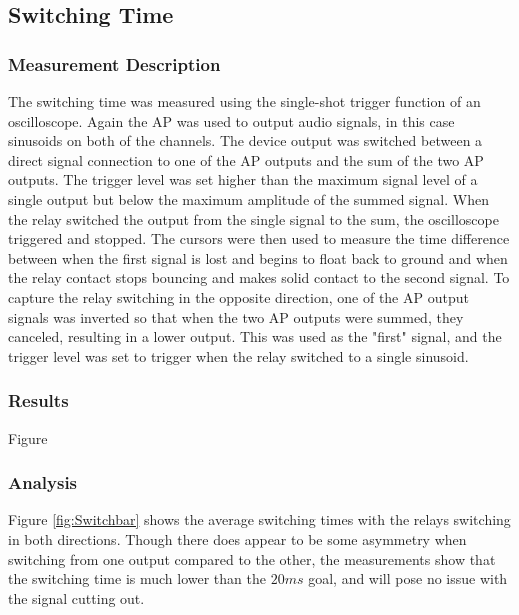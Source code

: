	\subsection{Switching Time}
		\subsubsection{Measurement Description}
		The switching time was measured using the single-shot trigger function of an oscilloscope.  Again the AP was used to output audio signals, in this case sinusoids on both of the channels.  The device output was switched between a direct signal connection to one of the AP outputs and the sum of the two AP outputs.  The trigger level was set higher than the maximum signal level of a single output but below the maximum amplitude of the summed signal.  When the relay switched the output from the single signal to the sum, the oscilloscope triggered and stopped.  The cursors were then used to measure the time difference between when the first signal is lost and begins to float back to ground and when the relay contact stops bouncing and makes solid contact to the second signal.  To capture the relay switching in the opposite direction, one of the AP output signals was inverted so that when the two AP outputs were summed, they canceled, resulting in a lower output.  This was used as the "first" signal, and the trigger level was set to trigger when the relay switched to a single sinusoid.

		\subsubsection{Results}
		Figure 




		\subsubsection{Analysis}

		Figure \ref{fig:Switchbar} shows the average switching times with the relays switching in both directions.  Though there does appear to be some asymmetry when switching from one output compared to the other, the measurements show that the switching time is much lower than the $20ms$ goal, and will pose no issue with the signal cutting out.


